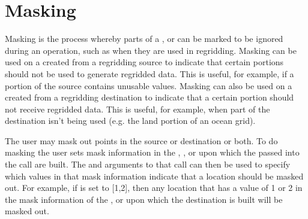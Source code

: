 \documentclass[letterpaper,10pt,english]{sphinxmanual}
\begin{document}
\section{Masking}
\label{\detokenize{api:id7}}\label{\detokenize{api:id8}}
Masking is the process whereby parts of a {\hyperref[\detokenize{grid:ESMF.api.grid.Grid}]{}}, {\hyperref[\detokenize{mesh:ESMF.api.mesh.Mesh}]{}} or {\hyperref[\detokenize{locstream:ESMF.api.locstream.LocStream}]{}} can be marked to be ignored
during an operation, such as when they are used in regridding. Masking can be used on a {\hyperref[\detokenize{field:ESMF.api.field.Field}]{}}
created from a regridding source to indicate that certain portions should not be used to generate
regridded data. This is useful, for example, if a portion of the source contains unusable values.
Masking can also be used on a {\hyperref[\detokenize{field:ESMF.api.field.Field}]{}} created from a regridding destination to indicate that a certain
portion should not receive regridded data. This is useful, for example, when part of the destination
isn’t being used (e.g. the land portion of an ocean grid).

The user may mask out points in the source {\hyperref[\detokenize{field:ESMF.api.field.Field}]{}} or destination {\hyperref[\detokenize{field:ESMF.api.field.Field}]{}} or both. To do masking the user
sets mask information in the {\hyperref[\detokenize{grid:ESMF.api.grid.Grid}]{}}, {\hyperref[\detokenize{mesh:ESMF.api.mesh.Mesh}]{}}, or {\hyperref[\detokenize{locstream:ESMF.api.locstream.LocStream}]{}} upon
which the {\hyperref[\detokenize{field:ESMF.api.field.Field}]{}} passed into the {\hyperref[\detokenize{regrid:ESMF.api.regrid.Regrid}]{}} call are built. The  and
 arguments to that call can then be used to specify which values in that mask information
indicate that a location should be masked out. For example, if  is set to {[}1,2{]}, then any
location that has a value of 1 or 2 in the mask information of the {\hyperref[\detokenize{grid:ESMF.api.grid.Grid}]{}}, {\hyperref[\detokenize{mesh:ESMF.api.mesh.Mesh}]{}} or {\hyperref[\detokenize{locstream:ESMF.api.locstream.LocStream}]{}} upon which
the destination {\hyperref[\detokenize{field:ESMF.api.field.Field}]{}} is built will be masked out.
\end{document}
